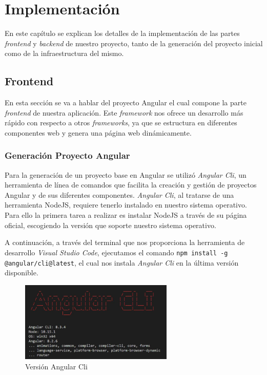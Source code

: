 \chapter{Implementación}
     En este capítulo se explican los detalles de la implementación de las partes \textit{frontend} y \textit{backend} de nuestro proyecto, tanto de la generación del proyecto inicial como de la infraestructura del mismo.
    
    
    \section{Frontend}
    En esta sección se va a hablar del proyecto Angular el cual compone la parte \textit{frontend} de nuestra aplicación. Este \textit{framework} nos ofrece un desarrollo más rápido con respecto a otros \textit{frameworks}, ya que se estructura en diferentes componentes web y genera una página web dinámicamente.
    \subsection{Generación Proyecto Angular}
    Para la generación de un proyecto base en Angular se utilizó \textit{Angular Cli}, un herramienta de línea de comandos que facilita la creación y gestión de proyectos Angular y de sus diferentes componentes.
    \textit{Angular Cli}, al tratarse de  una herramienta NodeJS, requiere tenerlo instalado en nuestro sistema operativo. Para ello la primera tarea a realizar es instalar NodeJS a través de su página oficial\cite{nodejs}, escogiendo la versión que soporte nuestro sistema operativo.
 
    A continuación, a través del terminal que nos proporciona la herramienta de desarrollo \textit{Visual Studio Code}, ejecutamos el comando \texttt{npm install -g @angular/cli@latest}, el cual nos instala \textit{Angular Cli} en la última versión disponible.
    
    \begin{figure}[h]
    \centering
     \includegraphics[width=0.65\textwidth]{images/angularversion}
    \caption{Versión Angular Cli}
    \end{figure}
    
